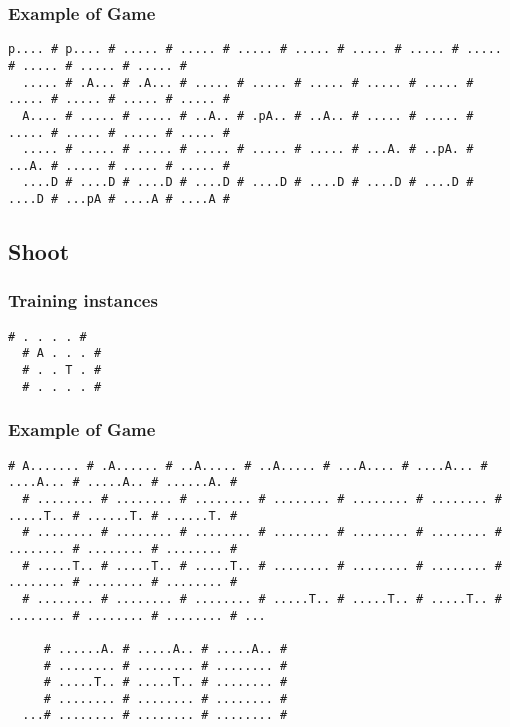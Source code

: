 \documentclass[a4paper]{article}
\begin{document}
\subsubsection{Example of Game}
\begin{Verbatim}[fontsize=\footnotesize]
  p.... # p.... # ..... # ..... # ..... # ..... # ..... # ..... # ..... # ..... # ..... # ..... #
  ..... # .A... # .A... # ..... # ..... # ..... # ..... # ..... # ..... # ..... # ..... # ..... #
  A.... # ..... # ..... # ..A.. # .pA.. # ..A.. # ..... # ..... # ..... # ..... # ..... # ..... #
  ..... # ..... # ..... # ..... # ..... # ..... # ...A. # ..pA. # ...A. # ..... # ..... # ..... #
  ....D # ....D # ....D # ....D # ....D # ....D # ....D # ....D # ....D # ...pA # ....A # ....A #
\end{Verbatim}

\subsection{Shoot}

\subsubsection{Training instances}
\begin{Verbatim}[fontsize=\footnotesize]
  # . . . . #
  # A . . . #
  # . . T . #
  # . . . . #
\end{Verbatim}

\subsubsection{Example of Game}
\begin{Verbatim}[fontsize=\footnotesize]
  # A....... # .A...... # ..A..... # ..A..... # ...A.... # ....A... # ....A... # .....A.. # ......A. #
  # ........ # ........ # ........ # ........ # ........ # ........ # .....T.. # ......T. # ......T. #
  # ........ # ........ # ........ # ........ # ........ # ........ # ........ # ........ # ........ #
  # .....T.. # .....T.. # .....T.. # ........ # ........ # ........ # ........ # ........ # ........ #
  # ........ # ........ # ........ # .....T.. # .....T.. # .....T.. # ........ # ........ # ........ # ...

     # ......A. # .....A.. # .....A.. #
     # ........ # ........ # ........ #
     # .....T.. # .....T.. # ........ #
     # ........ # ........ # ........ #
  ...# ........ # ........ # ........ #

\end{Verbatim}
\end{document}
